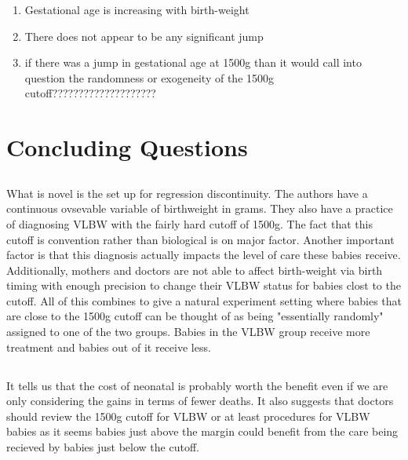 \documentclass[11pt]{article}
\begin{document}
\begin{enumerate}
	\item Gestational age is increasing with birth-weight
	\item There does not appear to be any significant jump 
	\item if there was a jump in gestational age at 1500g than it would call into question the randomness or exogeneity of the 1500g cutoff????????????????????
\end{enumerate}

\section{Concluding Questions}
\subsection{}
What is novel is the set up for regression discontinuity. The authors have a continuous ovsevable variable of birthweight in grams. They also have a practice of diagnosing VLBW with the fairly hard cutoff of 1500g. The fact that this cutoff is convention rather than biological is on major factor. Another important factor is that this diagnosis actually impacts the level of care these babies receive. Additionally, mothers and doctors are not able to affect birth-weight via birth timing with enough precision to change their VLBW status for babies clost to the cutoff. All of this combines to give a natural experiment setting where babies that are close to the 1500g cutoff can be thought of as being "essentially randomly" assigned to one of the two groups. Babies in the VLBW group receive more treatment and babies out of it receive less.

\subsection{}

\subsection{}
It tells us that the cost of neonatal is probably worth the benefit even if we are only considering the gains in terms of fewer deaths. It also suggests that doctors should review the 1500g cutoff for VLBW or at least procedures for VLBW babies as it seems babies just above the margin could benefit from the care being recieved by babies just below the cutoff. 




\end{document}
